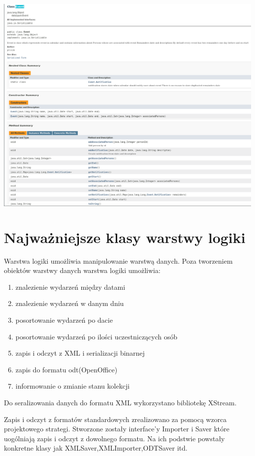 \documentclass[a4paper,12pt]{article}
\begin{document}
\begin{minipage}{\textwidth}

    \includegraphics[width=\textwidth]{./screen/dataLayer/Event.png}
    \label{Event}

\end{minipage}


\section{Najważniejsze klasy warstwy logiki}
       Warstwa logiki umożliwia manipulowanie warstwą danych. Poza tworzeniem obiektów warstwy danych warstwa logiki umożliwia:
\begin{enumerate}
 \item znalezienie wydarzeń między datami
 \item znalezienie wydarzeń w danym dniu
 \item posortowanie wydarzeń po dacie 
 \item posortowanie wydarzeń po ilości uczestniczących osób
 \item zapis i odczyt z XML i serializacji binarnej
 \item zapis do formatu odt(OpenOffice)
 \item informowanie o zmianie stanu kolekcji
\end{enumerate}

Do seralizowania danych do formatu XML wykorzystano bibliotekę XStream.

Zapis i odczyt z formatów standardowych zrealizowano za pomocą wzorca projektowego strategi. Stworzone zostały interface'y Importer i Saver które uogólniają zapis i odczyt z dowolnego formatu. Na ich podstwie powstały konkretne klasy jak XMLSaver,XMLImporter,ODTSaver itd.
\end{document}
